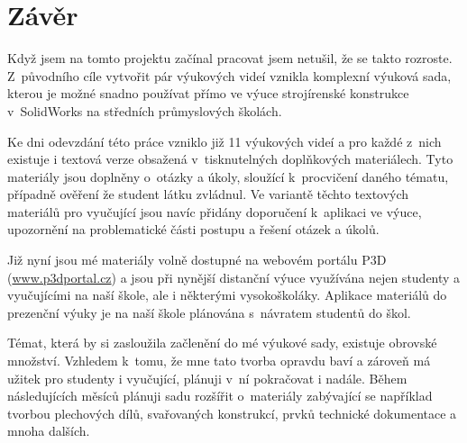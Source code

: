 \chapter*{Závěr}
Když jsem na tomto projektu začínal pracovat jsem netušil, že se takto rozroste.
Z~původního cíle vytvořit pár výukových videí vznikla komplexní výuková sada, kterou je možné snadno používat přímo ve výuce strojírenské konstrukce v~SolidWorks na středních průmyslových školách.

Ke dni odevzdání této práce vzniklo již 11 výukových videí a pro každé z~nich existuje i textová verze obsažená v~tisknutelných doplňkových materiálech.
Tyto materiály jsou doplněny o~otázky a úkoly, sloužící k~procvičení daného tématu, případně ověření že student látku zvládnul.
Ve variantě těchto textových materiálů pro vyučující jsou navíc přidány doporučení k~aplikaci ve výuce, upozornění na problematické části postupu a řešení otázek a úkolů.

Již nyní jsou mé materiály volně dostupné na webovém portálu P3D (\href{https://www.p3dportal.cz}{www.p3dportal.cz}) a jsou při nynější distanční výuce využívána nejen studenty a vyučujícími na naší škole, ale i některými vysokoškoláky.
Aplikace materiálů do prezenční výuky je na naší škole plánována s~návratem studentů do škol.

Témat, která by si zasloužila začlenění do mé výukové sady, existuje obrovské množství.
Vzhledem k~tomu, že mne tato tvorba opravdu baví a zároveň má užitek pro studenty i vyučující, plánuji v~ní pokračovat i nadále.
Během následujících měsíců plánuji sadu rozšířit o~materiály zabývající se například tvorbou plechových dílů, svařovaných konstrukcí, prvků technické dokumentace a mnoha dalších.

\newpage
